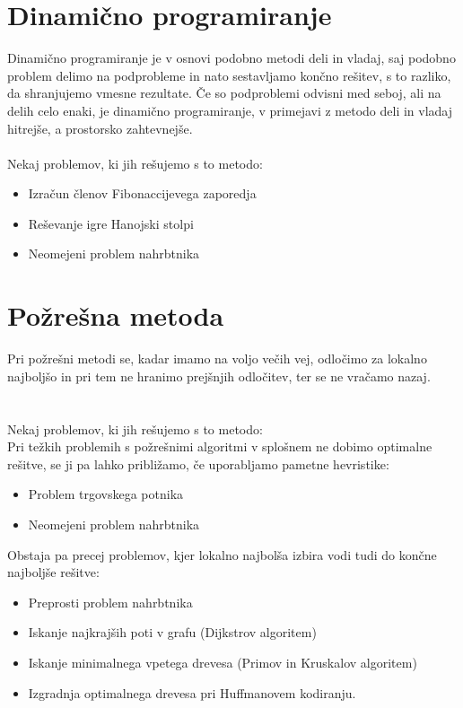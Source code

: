 \documentclass[10pt,a4paper,oneside]{book}
\newenvironment{items}{
\begin{itemize}
  \setlength{\itemsep}{1pt}
  \setlength{\parskip}{0pt}
  \setlength{\parsep}{0pt}
}{\end{itemize}}
\begin{document}
\section{Dinamično programiranje}
Dinamično programiranje je v osnovi podobno metodi deli in vladaj, saj podobno problem delimo na podprobleme in nato sestavljamo končno rešitev, s to razliko, da shranjujemo vmesne rezultate. Če so podproblemi odvisni med seboj, ali na delih celo enaki, je dinamično programiranje, v primejavi z metodo deli in vladaj hitrejše, a prostorsko zahtevnejše.\\
%
 \\
Nekaj problemov, ki jih rešujemo s to metodo:
\begin{items}
	\item Izračun členov Fibonaccijevega zaporedja
	\item Reševanje igre Hanojski stolpi
	\item Neomejeni problem nahrbtnika
\end{items}

\section{Požrešna metoda}
Pri požrešni metodi se, kadar imamo na voljo večih vej, odločimo za lokalno najboljšo in pri tem ne hranimo prejšnjih odločitev, ter se ne vračamo nazaj.\\
 \\
 \\
Nekaj problemov, ki jih rešujemo s to metodo:\\
Pri težkih problemih s požrešnimi algoritmi v splošnem ne dobimo optimalne rešitve, se ji pa lahko približamo, če uporabljamo pametne hevristike:
\begin{items}
	\item Problem trgovskega potnika
	\item Neomejeni problem nahrbtnika
\end{items}
Obstaja pa precej problemov, kjer lokalno najbolša izbira vodi tudi do končne najboljše rešitve:
\begin{items}
	\item Preprosti problem nahrbtnika
	\item Iskanje najkrajših poti v grafu (Dijkstrov algoritem)
	\item Iskanje minimalnega vpetega drevesa (Primov in Kruskalov algoritem)
	\item Izgradnja optimalnega drevesa pri Huffmanovem kodiranju.
\end{items}
\end{document}
